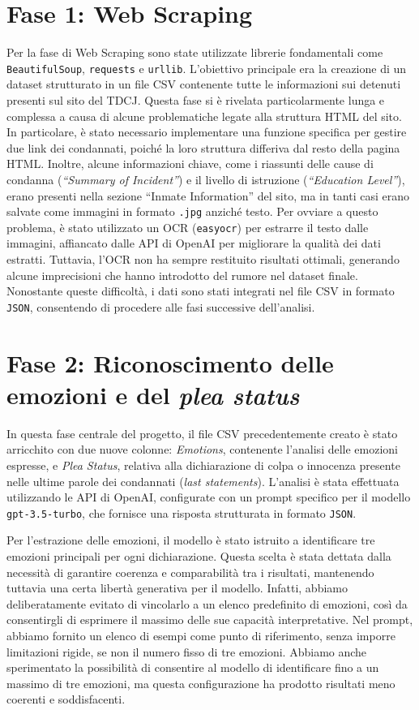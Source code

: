 \documentclass[11pt]{article}
\begin{document}
\section{Fase 1: Web Scraping}
Per la fase di Web Scraping sono state utilizzate librerie fondamentali come {\tt BeautifulSoup}, {\tt requests} e {\tt urllib}. L’obiettivo principale era la creazione di un dataset strutturato in un file CSV contenente tutte le informazioni sui detenuti presenti sul sito del TDCJ. Questa fase si è rivelata particolarmente lunga e complessa a causa di alcune problematiche legate alla struttura HTML del sito. In particolare, è stato necessario implementare una funzione specifica per gestire due link dei condannati, poiché la loro struttura differiva dal resto della pagina HTML. Inoltre, alcune informazioni chiave, come i riassunti delle cause di condanna (\textit{“Summary of Incident”}) e il livello di istruzione (\textit{“Education Level”}), erano presenti nella sezione “Inmate Information” del sito, ma in tanti casi erano salvate come immagini in formato {\tt .jpg} anziché testo. Per ovviare a questo problema, è stato utilizzato un OCR ({\tt easyocr}) per estrarre il testo dalle immagini, affiancato dalle API di OpenAI per migliorare la qualità dei dati estratti. Tuttavia, l’OCR non ha sempre restituito risultati ottimali, generando alcune imprecisioni che hanno introdotto del rumore nel dataset finale. Nonostante queste difficoltà, i dati sono stati integrati nel file CSV in formato {\tt JSON}, consentendo di procedere alle fasi successive dell’analisi.

\section{Fase 2: Riconoscimento delle emozioni e del \textit{plea status}}
In questa fase centrale del progetto, il file CSV precedentemente creato è stato arricchito con due nuove colonne: \textit{Emotions}, contenente l’analisi delle emozioni espresse, e \textit{Plea Status}, relativa alla dichiarazione di colpa o innocenza presente nelle ultime parole dei condannati (\textit{last statements}). L’analisi è stata effettuata utilizzando le API di OpenAI, configurate con un prompt specifico per il modello {\tt gpt-3.5-turbo}, che fornisce una risposta strutturata in formato {\tt JSON}.

Per l’estrazione delle emozioni, il modello è stato istruito a identificare tre emozioni principali per ogni dichiarazione. Questa scelta è stata dettata dalla necessità di garantire coerenza e comparabilità tra i risultati, mantenendo tuttavia una certa libertà generativa per il modello. Infatti, abbiamo deliberatamente evitato di vincolarlo a un elenco predefinito di emozioni, così da consentirgli di esprimere il massimo delle sue capacità interpretative. Nel prompt, abbiamo fornito un elenco di esempi come punto di riferimento, senza imporre limitazioni rigide, se non il numero fisso di tre emozioni. Abbiamo anche sperimentato la possibilità di consentire al modello di identificare fino a un massimo di tre emozioni, ma questa configurazione ha prodotto risultati meno coerenti e soddisfacenti.   
\end{document}
